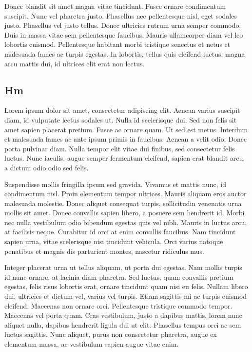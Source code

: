 \documentclass{article}
\begin{document}
Donec blandit sit amet magna vitae tincidunt. Fusce ornare condimentum suscipit. Nunc vel pharetra justo. Phasellus nec pellentesque nisl, eget sodales justo. Phasellus vel justo tellus. Donec ultricies rutrum urna semper commodo. Duis in massa vitae sem pellentesque faucibus. Mauris ullamcorper diam vel leo lobortis euismod. Pellentesque habitant morbi tristique senectus et netus et malesuada fames ac turpis egestas. In lobortis, tellus quis eleifend luctus, magna arcu mattis dui, id ultrices elit erat non lectus.
\subsection{Hm}


Lorem ipsum dolor sit amet, consectetur adipiscing elit. Aenean varius suscipit diam, id vulputate lectus sodales ut. Nulla id scelerisque dui. Sed non felis sit amet sapien placerat pretium. Fusce ac ornare quam. Ut sed est metus. Interdum et malesuada fames ac ante ipsum primis in faucibus. Aenean a velit odio. Donec porta pulvinar diam. Nulla tempor elit vitae dui finibus, sed consectetur felis luctus. Nunc iaculis, augue semper fermentum eleifend, sapien erat blandit arcu, a dictum odio odio sed felis.

Suspendisse mollis fringilla ipsum sed gravida. Vivamus et mattis nunc, id condimentum nisl. Proin elementum tempor ultrices. Mauris aliquam eros auctor malesuada molestie. Donec aliquet consequat turpis, sollicitudin venenatis urna mollis sit amet. Donec convallis sapien libero, a posuere sem hendrerit id. Morbi nec nulla vestibulum odio bibendum egestas quis vel nibh. Mauris in luctus arcu, at facilisis neque. Curabitur id orci at enim convallis faucibus. Nam tincidunt sapien urna, vitae scelerisque nisi tincidunt vehicula. Orci varius natoque penatibus et magnis dis parturient montes, nascetur ridiculus mus.

Integer placerat urna ut tellus aliquam, ut porta dui egestas. Nam mollis turpis id nunc ornare, at lacinia diam pharetra. Sed luctus, quam convallis pretium egestas, felis risus lobortis erat, ornare tincidunt quam nisi eu felis. Nullam libero dui, ultricies et dictum vel, varius vel turpis. Etiam sagittis mi ac turpis euismod eleifend. Maecenas non ornare orci. Pellentesque tristique commodo tempor. Maecenas vel porta quam. Cras vestibulum, justo a dapibus mattis, lorem nunc aliquet nulla, dapibus hendrerit ligula dui ut elit. Phasellus tempus orci ac sem luctus sagittis. Nunc aliquet, purus non consectetur pharetra, augue ex elementum massa, ac vestibulum sapien augue vitae enim.
\end{document}
